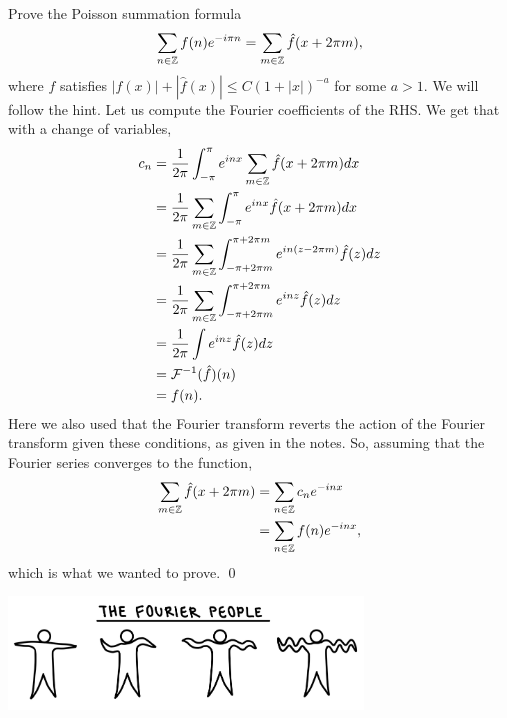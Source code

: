 \documentclass{article}
\begin{document}
\newpage
{} Prove the Poisson summation formula
\[\sum_
{n\in\mathbb{Z}}
f(n)e^{-i\pi n} = \sum_
{m\in \mathbb{Z}}\hat{f}(x + 2\pi m),\]
where $f$ satisfies $|f(x)|+ |\hat{f}(x)|\le C(1 + |x|)^{-a}$ for some $a > 1$.  \tri
\hop 
\solution
We will follow the hint. Let us compute the Fourier coefficients of the RHS. We get that with a change of variables,
\begin{align*}
    c_n  &= \frac{1}{2\pi} \int_{-\pi}^\pi e^{inx}\sum_{m \in \mathbb{Z}}\hat{f}(x+2\pi m) dx \\
    &= \frac{1}{2\pi} \sum_{m \in \mathbb{Z}} \int_{-\pi}^\pi e^{inx}\hat{f}(x+2\pi m) dx \\
    &= \frac{1}{2\pi} \sum_{m \in \mathbb{Z}} \int_{-\pi+2\pi m}^{\pi+2\pi m} e^{in(z - 2\pi m)}\hat{f}(z) dz \\
    &= \frac{1}{2\pi} \sum_{m \in \mathbb{Z}} \int_{-\pi+2\pi m}^{\pi+2\pi m} e^{inz}\hat{f}(z) dz \\
    &= \frac{1}{2\pi} \int e^{inz}\hat{f}(z) dz \\
    &= \mathcal{F}{^{-1}}(\hat{f})(n) \\
    &= f(n).
\end{align*}
Here we also used that the Fourier transform reverts the action of the Fourier transform given these conditions, as given in the notes. So, assuming that the Fourier series converges to the function, 
\begin{align*}
    \sum_{m \in \mathbb{Z}}\hat{f}(x+2\pi m) &=  \sum_{n \in \mathbb{Z}}c_ne^{-inx}\\
    &= \sum_{n \in \mathbb{Z}}f(n)e^{-inx},
\end{align*}
which is what we wanted to prove. \qed
\begin{center}
    \includegraphics[height=3cm]{../images/fourier-people}
\end{center}
\end{document}
